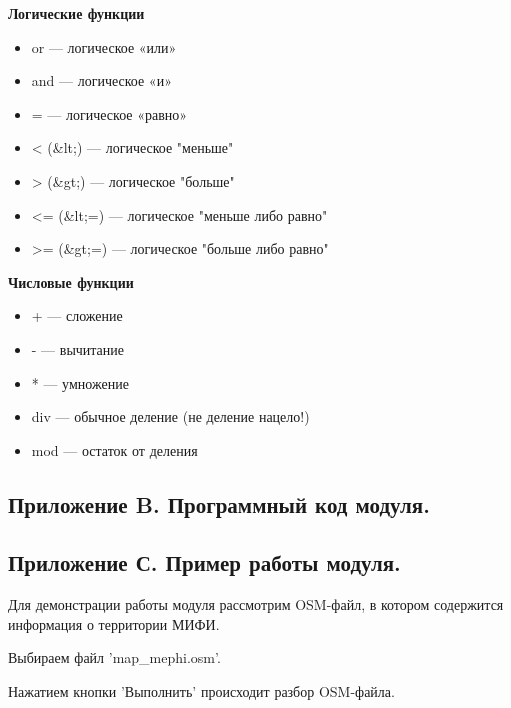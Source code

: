 \documentclass[12pt,a4paper,oneside]{article} %
\begin{document}
\textbf{Логические функции}

\begin{itemize}
\item or — логическое «или»
\item and — логическое «и»
\item = — логическое «равно»
\item < (\&lt;) — логическое "меньше"
\item > (\&gt;) — логическое "больше"
\item <= (\&lt;=) — логическое "меньше либо равно"
\item >= (\&gt;=) — логическое "больше либо равно"
\end{itemize}

\textbf{Числовые функции}

\begin{itemize}
\item + — сложение
\item - — вычитание
\item * — умножение
\item div — обычное деление (не деление нацело!)
\item mod — остаток от деления
\end{itemize}
\newpage
\subsection{Приложение B. Программный код модуля.}

\newpage
\subsection{Приложение С. Пример работы модуля.}
Для демонстрации работы модуля рассмотрим OSM-файл, в котором \linebreak
содержится информация о территории МИФИ.

Выбираем файл 'map\_mephi.osm'.

\begin{figure}[h!]
\end{figure}

Нажатием кнопки 'Выполнить' происходит разбор OSM-файла.
\end{document}
